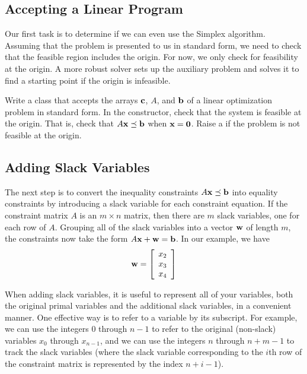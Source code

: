 \subsection*{Accepting a Linear Program} %

Our first task is to determine if we can even use the Simplex algorithm.
Assuming that the problem is presented to us in standard form, we need to check that the feasible region includes the origin.  For now, we only check for feasibility at the origin. A more robust solver sets up the auxiliary problem and solves it to find a starting point if the origin is infeasible.

\begin{problem} %
Write a class that accepts the arrays $\mathbf{c}$, $A$, and $\mathbf{b}$ of a linear optimization problem in standard form.
In the constructor, check that the system is feasible at the origin.
That is, check that $A\mathbf{x} \preceq \mathbf{b}$ when $\mathbf{x} = \mathbf{0}$. Raise a  if the problem is not feasible at the origin. \label{prob:initsolver}
\end{problem}

\subsection*{Adding Slack Variables} %

The next step is to convert the inequality constraints $A\mathbf{x} \preceq \mathbf{b}$ into equality constraints by introducing a slack variable for each constraint equation.
If the constraint matrix $A$ is an $m \times n$ matrix, then there are $m$ slack variables, one for each row of $A$.
Grouping all of the slack variables into a vector $\mathbf{w}$ of length $m$, the constraints now take the form $A\mathbf{x} + \mathbf{w} = \mathbf{b}$.
In our example, we have \[\mathbf{w} = \left[\begin{array}{c}x_2\\x_3 \\x_4\end{array}\right]\]

When adding slack variables, it is useful to represent all of your variables, both the original primal variables and the additional slack variables, in a convenient manner.
One effective way is to refer to a variable by its subscript.
For example, we can use the integers $0$ through $n-1$ to refer to the original (non-slack) variables $x_0$ through $x_{n-1}$, and we can use the integers $n$ through $n+m-1$ to track the slack variables (where the slack variable corresponding to the $i$th row of the constraint matrix is represented by the index $n+i-1$).

